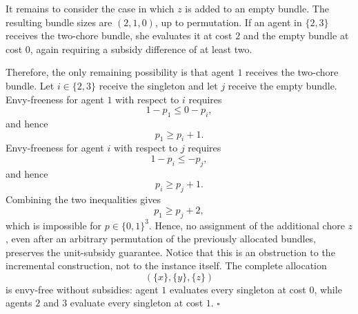 \begin{example}
It remains to consider the case in which $z$ is added to an empty bundle. The resulting bundle sizes are $(2,1,0)$, up to permutation. If an agent in $\{2,3\}$ receives the two-chore bundle, she evaluates it at cost $2$ and the empty bundle at cost $0$, again requiring a subsidy difference of at least two.

Therefore, the only remaining possibility is that agent $1$ receives the two-chore bundle. Let $i\in\{2,3\}$ receive the singleton and let $j$ receive the empty bundle. Envy-freeness for agent $1$ with respect to $i$ requires
\[
1-p_1\le 0-p_i,
\]
and hence
\[
p_1\ge p_i+1.
\]
Envy-freeness for agent $i$ with respect to $j$ requires
\[
1-p_i\le -p_j,
\]
and hence
\[
p_i\ge p_j+1.
\]
Combining the two inequalities gives
\[
p_1\ge p_j+2,
\]
which is impossible for $p\in\{0,1\}^3$. Hence, no assignment of the additional chore $z$, even after an arbitrary permutation of the previously allocated bundles, preserves the unit-subsidy guarantee. Notice that this is an obstruction to the incremental construction, not to the instance itself. The complete allocation
\[
(\{x\},\{y\},\{z\})
\]
is envy-free without subsidies: agent $1$ evaluates every singleton at cost $0$, while agents $2$ and $3$ evaluate every singleton at cost $1$. \hfill $\square$
\end{example}